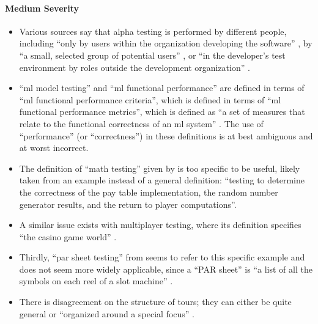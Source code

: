 \paragraph{Medium Severity}
\begin{itemize}\fi
      \item %
            Various sources say that alpha testing is performed by different
            people, including ``only by users within the organization
            developing the software'' \citep[p.~17]{IEEE2017}, by ``a small,
            selected group of potential users'' \citep[p.~5-8]{SWEBOK2024}, or
            ``in the developer's test environment by roles outside the
            development organization'' \citepISTQB{}.
      \item %
            ``\acf{ml} model testing'' and ``\acs{ml} functional performance''
            are defined in terms of ``\acs{ml} functional performance criteria'',
            which is defined in terms of ``\acs{ml} functional performance
            metrics'', which is defined as ``a set of measures that relate to the
            functional correctness of an \acs{ml} system'' \citepISTQB{}. The use
            of ``performance'' (or ``correctness'') in these definitions is at
            best ambiguous and at worst incorrect.
            \ifnotpaper
      \item %
            The definition of ``math testing'' given by \citetISTQB{} is
            too specific to be useful, likely taken from an example instead of
            a general definition: ``testing to determine the correctness of the
            pay table implementation, the random number generator results, and
            the return to player computations''.
      \item %
            A similar issue exists with multiplayer testing, where its
            definition specifies ``the casino game world'' \citepISTQB{}.
      \item %
            Thirdly, ``par sheet testing'' from \citepISTQB{} seems to
            refer to this specific example and does not seem more widely
            applicable, since a ``PAR sheet'' is ``a list of all the symbols
            on each reel of a slot machine'' \citep{Bluejay2024}.\fi
      \item %
            There is disagreement on the structure of tours; they can either be
            quite general \citep[p.~34]{IEEE2022} or ``organized around a
            special focus'' \citepISTQB{}.
\end{itemize}

